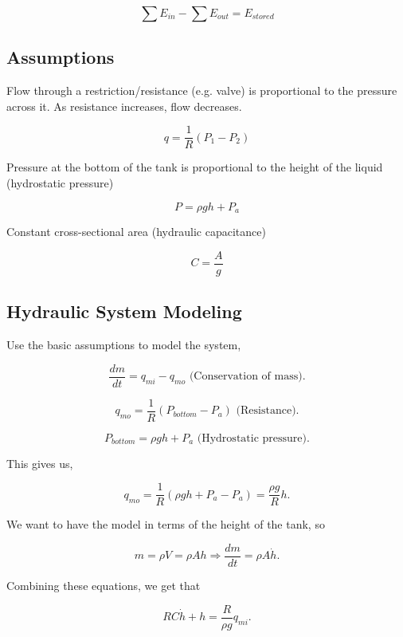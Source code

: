 \documentclass[12pt, a4paper]{report}
\begin{document}
  \begin{equation}
    \sum E_{in} - \sum E_{out} = E_{stored}
  \end{equation}

  \subsection{Assumptions}

  Flow through a restriction/resistance (e.g. valve) is proportional to the pressure across it. As resistance increases, flow decreases.

  \begin{equation}
    q = \frac{1}{R}(P_1 - P_2)
  \end{equation}

  Pressure at the bottom of the tank is proportional to the height of the liquid (hydrostatic pressure)

  \begin{equation}
    P = \rho gh + P_a
  \end{equation}

  Constant cross-sectional area (hydraulic capacitance)

  \begin{equation}
    C = \frac{A}{g}
  \end{equation}

  \subsection{Hydraulic System Modeling}

  Use the basic assumptions to model the system,

  \[
      \frac{dm}{dt} = q_{mi} - q_{mo} \text{ (Conservation of mass)}
    .\]

  \[
      q_{mo} = \frac{1}{R} \left( P_{bottom} - P_a \right) \text{ (Resistance)}
    .\]

  \[
      P_{bottom} = \rho gh + P_a \text{ (Hydrostatic pressure)}
    .\]

  This gives us,

  \[
      q_{mo} = \frac{1}{R} \left( \rho gh + P_a - P_a \right) = \frac{\rho g}{R}h
    .\]

  We want to have the model in terms of the height of the tank, so

  \[
      m = \rho V = \rho Ah \Rightarrow \frac{dm}{dt} = \rho A \dot h
    .\]

  Combining these equations, we get that

  \[
      RC\dot h + h = \frac{R}{\rho g}q_{mi}
    .\]
\end{document}
